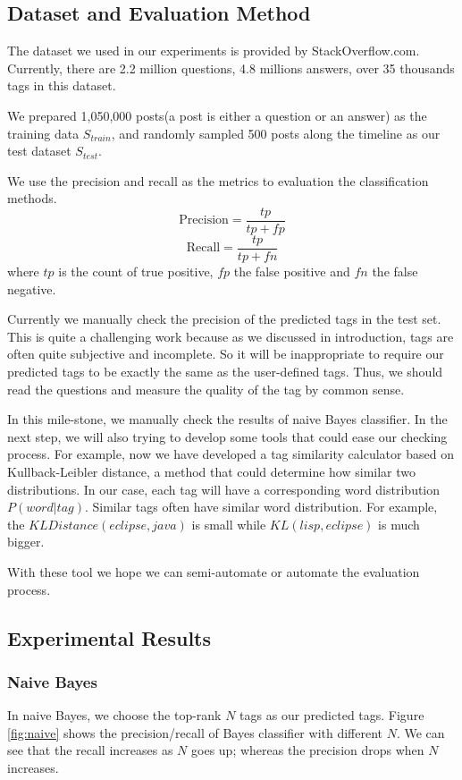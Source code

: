 
\subsection{Dataset and Evaluation Method}
The dataset we used in our experiments is provided by StackOverflow.com. Currently, there are 2.2 million questions, 4.8 millions answers, over 35 thousands tags in this dataset\cite{DataDump}.

We prepared 1,050,000 posts(a post is either a question or an answer)  as the training data $S_{train}$, and randomly sampled 500 posts along the timeline as our test dataset $S_{test}$.

We use the precision and recall as the metrics to evaluation the classification methods.
$$ \text{Precision}=\frac{tp}{tp+fp} $$
$$ \text{Recall}=\frac{tp}{tp+fn} $$
where $tp$ is the count of true positive, $fp$ the false positive and $fn$ the false negative.

Currently we manually check the precision of the predicted tags in the test set. This is quite a challenging work because as we discussed in introduction, tags are often quite subjective and incomplete. So it will be inappropriate to require our predicted tags to be exactly the same as the user-defined tags. Thus, we should read the questions and measure the quality of the tag by common sense. 

In this mile-stone, we manually check the results of naive Bayes classifier. In the next step, we will also trying to develop some tools that could ease our checking process. For example, now we have developed a tag similarity calculator based on Kullback-Leibler distance, a method that could determine how similar two 
distributions. In our case, each tag will have a corresponding word distribution $P(word|tag)$. Similar tags often have similar word distribution. For example, the $KLDistance(eclipse, java)$ is small while $KL(lisp, eclipse)$ is much bigger.

With these tool we hope we can semi-automate or automate the evaluation
process.

\subsection{Experimental Results}
\subsubsection{Naive Bayes}
In naive Bayes, we choose the top-rank $N$ tags as our predicted tags. Figure \ref{fig:naive} shows the precision/recall of Bayes classifier with different $N$. We can see that the recall increases as $N$ goes up; whereas the precision drops when $N$ increases.

